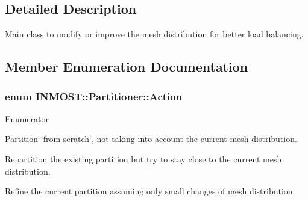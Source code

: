 \subsection{Detailed Description}
Main class to modify or improve the mesh distribution for better load balancing. 

\subsection{Member Enumeration Documentation}
\hypertarget{classINMOST_1_1Partitioner_a0a4053a79855f16dbb53c13b39bc75c3}{
\subsubsection[{Action}]{\setlength{\rightskip}{0pt plus 5cm}enum {\bf I\-N\-M\-O\-S\-T\-::\-Partitioner\-::\-Action}}}\label{classINMOST_1_1Partitioner_a0a4053a79855f16dbb53c13b39bc75c3}
\begin{Desc}
\item[Enumerator]\par
\begin{description}
\item[{\em 
\hypertarget{classINMOST_1_1Partitioner_a0a4053a79855f16dbb53c13b39bc75c3ad747444c0947b3a6a697efd54ae42771}{Partition}\label{classINMOST_1_1Partitioner_a0a4053a79855f16dbb53c13b39bc75c3ad747444c0947b3a6a697efd54ae42771}
}]Partition \char`\"{}from scratch\char`\"{}, not taking into account the current mesh distribution. \item[{\em 
\hypertarget{classINMOST_1_1Partitioner_a0a4053a79855f16dbb53c13b39bc75c3ae667d6f0560495262c0010866080eff8}{Repartition}\label{classINMOST_1_1Partitioner_a0a4053a79855f16dbb53c13b39bc75c3ae667d6f0560495262c0010866080eff8}
}]Repartition the existing partition but try to stay close to the current mesh distribution. \item[{\em 
\hypertarget{classINMOST_1_1Partitioner_a0a4053a79855f16dbb53c13b39bc75c3a2d75221ee80b15356021e80283da41d6}{Refine}\label{classINMOST_1_1Partitioner_a0a4053a79855f16dbb53c13b39bc75c3a2d75221ee80b15356021e80283da41d6}
}]Refine the current partition assuming only small changes of mesh distribution. \end{description}
\end{Desc}
